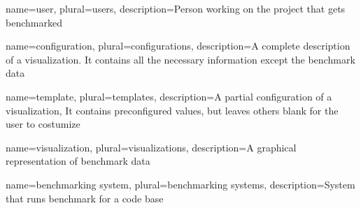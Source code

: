 \makenoidxglossaries

{
	name=user,
	plural=users,
	description={Person working on the project that gets benchmarked}
}

{
	name=configuration,
	plural=configurations,
	description={A complete description of a \gls{visualization}. It contains all the necessary information except the benchmark data}
}

{
	name=template,
	plural=templates,
	description={A partial configuration of a \gls{visualization}, It contains preconfigured values, but leaves others blank for the user to costumize}
}

{
	name=visualization,
	plural=visualizations,
	description={A graphical representation of benchmark data}
}

{
	name=benchmarking system,
	plural=benchmarking systems,
	description={System that runs benchmark for a code base}
}


